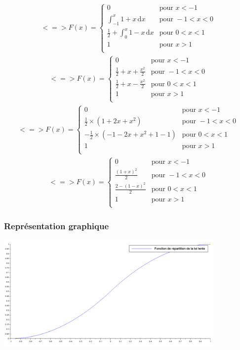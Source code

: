 \documentclass{article}
\begin{document}
\begin{align}
<=>
F(x)=\left\{
	\begin{array}{llll}
		0 &\mbox{pour } x<-1\\
		\displaystyle \int_{-1 }^{x} 1+x \, \mathrm{d}x &\mbox{pour } -1<x<0\\
		\frac{1}{2}+\displaystyle \int_{0}^{x} 1-x \, \mathrm{d}x &\mbox{pour } 0<x<1\\
		1 &\mbox{pour } x>1\\
	\end{array}
\right. 
\end{align}
\begin{align}
<=>
F(x)=\left\{
	\begin{array}{llll}
		0 & \mbox{pour } x<-1\\
		\frac{1}{2} + x + \frac{x^2}{2} &\mbox{pour } -1<x<0\\
		\frac{1}{2} + x - \frac{x^2}{2} &\mbox{pour } 0<x<1\\
		1 & \mbox{pour } x>1\\
	\end{array}
\right.
\end{align}
\begin{align}
<=>
F(x)=\left\{
	\begin{array}{llll}
		0 & \mbox{pour } x<-1\\
		\frac{1}{2} \times (1 + 2x + x^2) &\mbox{pour } -1<x<0\\
		-\frac{1}{2} \times (-1 - 2x + x^2 +1 -1) &\mbox{pour } 0<x<1\\
		1 & \mbox{pour } x>1\\
	\end{array}
\right.
\end{align}
\begin{align}
<=>
F(x)=\left\{
	\begin{array}{llll}
		0 & \mbox{pour } x<-1\\
		\frac{(1+x)^2}{2} &\mbox{pour } -1<x<0\\
		\frac{2-(1-x)^2}{2} &\mbox{pour } 0<x<1\\
		1 & \mbox{pour } x>1\\
	\end{array}
\right.
\end{align}

\subsubsection{Représentation graphique}
\begin{center}
\includegraphics[width=425px]{img/tente_repartition.png}
\end{center}
\end{document}
